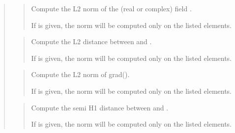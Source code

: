 \documentclass[a4paper,11pt,english]{sphinxmanual}
\begin{document}
\sphinxAtStartPar
{}
\begin{quote}

\sphinxAtStartPar
{}
\begin{quote}

\sphinxAtStartPar
Compute the L2 norm of the (real or complex) field .

\sphinxAtStartPar
If  is given, the norm will be computed only on the listed
elements.
\end{quote}

\sphinxAtStartPar
{}
\begin{quote}

\sphinxAtStartPar
Compute the L2 distance between  and .

\sphinxAtStartPar
If  is given, the norm will be computed only on the listed
elements.
\end{quote}

\sphinxAtStartPar
{}
\begin{quote}

\sphinxAtStartPar
Compute the L2 norm of grad().

\sphinxAtStartPar
If  is given, the norm will be computed only on the listed
elements.
\end{quote}

\sphinxAtStartPar
{}
\begin{quote}

\sphinxAtStartPar
Compute the semi H1 distance between  and .

\sphinxAtStartPar
If  is given, the norm will be computed only on the listed
elements.
\end{quote}

\sphinxAtStartPar
{}
\begin{quote}


\end{quote}
\end{quote}
\end{document}
